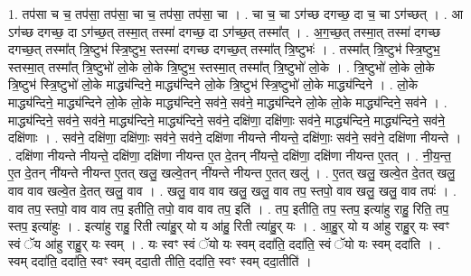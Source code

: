 \documentclass[17pt]{extarticle}
\begin{document}
1. तप॑सा च च॒ तप॑सा॒ तप॑सा॒ चा च॒ तप॑सा॒ तप॑सा॒ चा । . चा च॒ चा ऽग॑च्छ दगच्छ॒ दा च॒ चा ऽग॑च्छत् । . आ ऽग॑च्छ दगच्छ॒ दा ऽग॑च्छ॒त् तस्मा॒त् तस्मा॑ दगच्छ॒ दा ऽग॑च्छ॒त् तस्मा᳚त् । . अ॒ग॒च्छ॒त् तस्मा॒त् तस्मा॑ दगच्छ दगच्छ॒त् तस्मा᳚त् त्रि॒ष्टुभ॑ स्त्रि॒ष्टुभ॒ स्तस्मा॑ दगच्छ दगच्छ॒त् तस्मा᳚त् त्रि॒ष्टुभः॑ । . तस्मा᳚त् त्रि॒ष्टुभ॑ स्त्रि॒ष्टुभ॒ स्तस्मा॒त् तस्मा᳚त् त्रि॒ष्टुभो॑ लो॒के लो॒के त्रि॒ष्टुभ॒ स्तस्मा॒त् तस्मा᳚त् त्रि॒ष्टुभो॑ लो॒के । . त्रि॒ष्टुभो॑ लो॒के लो॒के त्रि॒ष्टुभ॑ स्त्रि॒ष्टुभो॑ लो॒के माद्ध्य॑न्दिने॒ माद्ध्य॑न्दिने लो॒के त्रि॒ष्टुभ॑ स्त्रि॒ष्टुभो॑ लो॒के माद्ध्य॑न्दिने । . लो॒के माद्ध्य॑न्दिने॒ माद्ध्य॑न्दिने लो॒के लो॒के माद्ध्य॑न्दिने॒ सव॑ने॒ सव॑ने॒ माद्ध्य॑न्दिने लो॒के लो॒के माद्ध्य॑न्दिने॒ सव॑ने । . माद्ध्य॑न्दिने॒ सव॑ने॒ सव॑ने॒ माद्ध्य॑न्दिने॒ माद्ध्य॑न्दिने॒ सव॑ने॒ दक्षि॑णा॒ दक्षि॑णाः॒ सव॑ने॒ माद्ध्य॑न्दिने॒ माद्ध्य॑न्दिने॒ सव॑ने॒ दक्षि॑णाः । . सव॑ने॒ दक्षि॑णा॒ दक्षि॑णाः॒ सव॑ने॒ सव॑ने॒ दक्षि॑णा नीयन्ते नीयन्ते॒ दक्षि॑णाः॒ सव॑ने॒ सव॑ने॒ दक्षि॑णा नीयन्ते । . दक्षि॑णा नीयन्ते नीयन्ते॒ दक्षि॑णा॒ दक्षि॑णा नीयन्त ए॒त दे॒तन् नी॑यन्ते॒ दक्षि॑णा॒ दक्षि॑णा नीयन्त ए॒तत् । . नी॒य॒न्त॒ ए॒त दे॒तन् नी॑यन्ते नीयन्त ए॒तत् खलु॒ खल्वे॒तन् नी॑यन्ते नीयन्त ए॒तत् खलु॑ । . ए॒तत् खलु॒ खल्वे॒त दे॒तत् खलु॒ वाव वाव खल्वे॒त दे॒तत् खलु॒ वाव । . खलु॒ वाव वाव खलु॒ खलु॒ वाव तप॒ स्तपो॒ वाव खलु॒ खलु॒ वाव तपः॑ । . वाव तप॒ स्तपो॒ वाव वाव तप॒ इतीति॒ तपो॒ वाव वाव तप॒ इति॑ । . तप॒ इतीति॒ तप॒ स्तप॒ इत्या॑हु राहु॒ रिति॒ तप॒ स्तप॒ इत्या॑हुः । . इत्या॑हु राहु॒ रिती त्या॑हु॒र् यो य आ॑हु॒ रिती त्या॑हु॒र् यः । . आ॒हु॒र् यो य आ॑हु राहु॒र् यः स्वꣳ स्वं ॅय आ॑हु राहु॒र् यः स्वम् । . यः स्वꣳ स्वं ॅयो यः स्वम् ददा॑ति॒ ददा॑ति॒ स्वं ॅयो यः स्वम् ददा॑ति । . स्वम् ददा॑ति॒ ददा॑ति॒ स्वꣳ स्वम् ददा॒ती तीति॒ ददा॑ति॒ स्वꣳ स्वम् ददा॒तीति॑ । \newline
\end{document}
